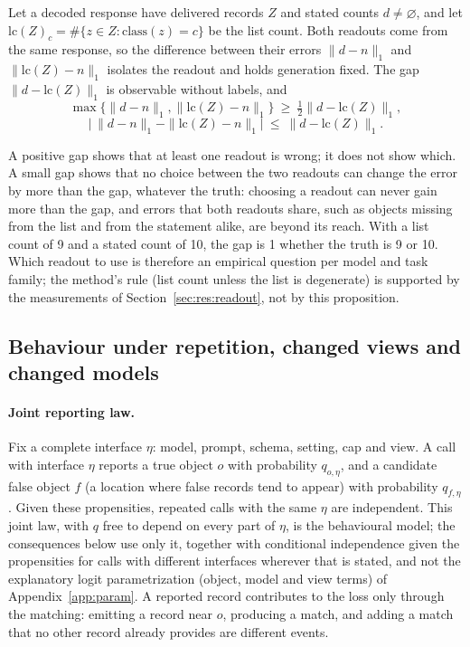 \begin{proposition}\label{prop:readout}
Let a decoded response have delivered records $Z$ and stated counts $d\neq\varnothing$, and let $\mathrm{lc}(Z)_c=\#\{z\in Z:\mathrm{class}(z)=c\}$ be the list count. Both readouts come from the same response, so the difference between their errors $\|d-n\|_1$ and $\|\mathrm{lc}(Z)-n\|_1$ isolates the readout and holds generation fixed. The gap $\|d-\mathrm{lc}(Z)\|_1$ is observable without labels, and
\[
\max\{\|d-n\|_1,\|\mathrm{lc}(Z)-n\|_1\}\ \ge\ \tfrac12\|d-\mathrm{lc}(Z)\|_1,
\]
\[
\big|\,\|d-n\|_1-\|\mathrm{lc}(Z)-n\|_1\big|\ \le\ \|d-\mathrm{lc}(Z)\|_1 .
\]
\end{proposition}
A positive gap shows that at least one readout is wrong; it does not show which. A small gap shows that no choice between the two readouts can change the error by more than the gap, whatever the truth: choosing a readout can never gain more than the gap, and errors that both readouts share, such as objects missing from the list and from the statement alike, are beyond its reach. With a list count of 9 and a stated count of 10, the gap is 1 whether the truth is 9 or 10. Which readout to use is therefore an empirical question per model and task family; the method's rule (list count unless the list is degenerate) is supported by the measurements of Section~\ref{sec:res:readout}, not by this proposition.

\subsection{Behaviour under repetition, changed views and changed models}\label{sec:theory:behaviour}

\paragraph{Joint reporting law.} Fix a complete interface $\eta$: model, prompt, schema, setting, cap and view. A call with interface $\eta$ reports a true object $o$ with probability $q_{o,\eta}$, and a candidate false object $f$ (a location where false records tend to appear) with probability $q_{f,\eta}$. Given these propensities, repeated calls with the same $\eta$ are independent. This joint law, with $q$ free to depend on every part of $\eta$, is the behavioural model; the consequences below use only it, together with conditional independence given the propensities for calls with different interfaces wherever that is stated, and not the explanatory logit parametrization (object, model and view terms) of Appendix~\ref{app:param}. A reported record contributes to the loss only through the matching: emitting a record near $o$, producing a match, and adding a match that no other record already provides are different events.

